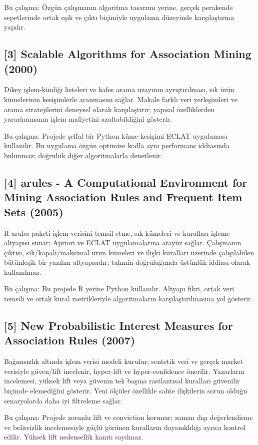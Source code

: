 \documentclass[conference,a4paper]{IEEEtran}
\begin{document}
Bu çalışma: Özgün çalışmanın algoritma tasarımı yerine, gerçek perakende sepetlerinde ortak eşik ve çıktı biçimiyle uygulama düzeyinde karşılaştırma yapılır.

\subsection{[3] Scalable Algorithms for Association Mining (2000)}
Dikey işlem-kimliği listeleri ve kafes arama uzayının ayrıştırılması, sık ürün kümelerinin kesişimlerle aranmasını sağlar. Makale farklı veri yerleşimleri ve arama stratejilerini deneysel olarak karşılaştırır; yapısal özelliklerden yararlanmanın işlem maliyetini azaltabildiğini gösterir.

Bu çalışma: Projede şeffaf bir Python küme-kesişimi ECLAT uygulaması kullanılır. Bu uygulama özgün optimize kodla aynı performans iddiasında bulunmaz; doğruluk diğer algoritmalarla denetlenir.

\subsection{[4] arules - A Computational Environment for Mining Association Rules and Frequent Item Sets (2005)}
R arules paketi işlem verisini temsil etme, sık kümeleri ve kuralları işleme altyapısı sunar; Apriori ve ECLAT uygulamalarına arayüz sağlar. Çalışmanın çıktısı, sık/kapalı/maksimal ürün kümeleri ve ilişki kuralları üzerinde çalışılabilen bütünleşik bir yazılım altyapısıdır; tahmin doğruluğunda üstünlük iddiası olarak kullanılmaz.

Bu çalışma: Bu projede R yerine Python kullanılır. Altyapı fikri, ortak veri temsili ve ortak kural metrikleriyle algoritmaların karşılaştırılmasına yol gösterir.

\subsection{[5] New Probabilistic Interest Measures for Association Rules (2007)}
Bağımsızlık altında işlem verisi modeli kurulur; sentetik veri ve gerçek market verisiyle güven/lift incelenir, hyper-lift ve hyper-confidence önerilir. Yazarların incelemesi, yüksek lift veya güvenin tek başına rastlantısal kuralları güvenilir biçimde elemediğini gösterir. Yeni ölçüler özellikle sahte ilişkilerin sorun olduğu senaryolarda daha iyi filtreleme sağlar.

Bu çalışma: Projede zorunlu lift ve conviction korunur; zaman dışı değerlendirme ve belirsizlik incelemesiyle güçlü görünen kuralların dayanıklılığı ayrıca kontrol edilir. Yüksek lift nedensellik kanıtı sayılmaz.
\end{document}
